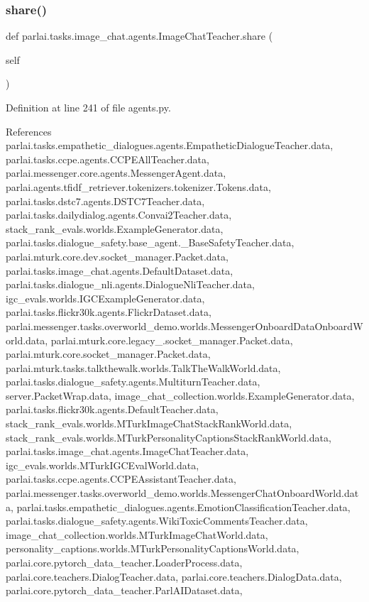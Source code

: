 \subsubsection{\texorpdfstring{share()}{share()}}
{\footnotesize\ttfamily def parlai.\+tasks.\+image\+\_\+chat.\+agents.\+Image\+Chat\+Teacher.\+share (\begin{DoxyParamCaption}\item[{}]{self }\end{DoxyParamCaption})}



Definition at line 241 of file agents.\+py.



References parlai.\+tasks.\+empathetic\+\_\+dialogues.\+agents.\+Empathetic\+Dialogue\+Teacher.\+data, parlai.\+tasks.\+ccpe.\+agents.\+C\+C\+P\+E\+All\+Teacher.\+data, parlai.\+messenger.\+core.\+agents.\+Messenger\+Agent.\+data, parlai.\+agents.\+tfidf\+\_\+retriever.\+tokenizers.\+tokenizer.\+Tokens.\+data, parlai.\+tasks.\+dstc7.\+agents.\+D\+S\+T\+C7\+Teacher.\+data, parlai.\+tasks.\+dailydialog.\+agents.\+Convai2\+Teacher.\+data, stack\+\_\+rank\+\_\+evals.\+worlds.\+Example\+Generator.\+data, parlai.\+tasks.\+dialogue\+\_\+safety.\+base\+\_\+agent.\+\_\+\+Base\+Safety\+Teacher.\+data, parlai.\+mturk.\+core.\+dev.\+socket\+\_\+manager.\+Packet.\+data, parlai.\+tasks.\+image\+\_\+chat.\+agents.\+Default\+Dataset.\+data, parlai.\+tasks.\+dialogue\+\_\+nli.\+agents.\+Dialogue\+Nli\+Teacher.\+data, igc\+\_\+evals.\+worlds.\+I\+G\+C\+Example\+Generator.\+data, parlai.\+tasks.\+flickr30k.\+agents.\+Flickr\+Dataset.\+data, parlai.\+messenger.\+tasks.\+overworld\+\_\+demo.\+worlds.\+Messenger\+Onboard\+Data\+Onboard\+World.\+data, parlai.\+mturk.\+core.\+legacy\+\_.\+socket\+\_\+manager.\+Packet.\+data, parlai.\+mturk.\+core.\+socket\+\_\+manager.\+Packet.\+data, parlai.\+mturk.\+tasks.\+talkthewalk.\+worlds.\+Talk\+The\+Walk\+World.\+data, parlai.\+tasks.\+dialogue\+\_\+safety.\+agents.\+Multiturn\+Teacher.\+data, server.\+Packet\+Wrap.\+data, image\+\_\+chat\+\_\+collection.\+worlds.\+Example\+Generator.\+data, parlai.\+tasks.\+flickr30k.\+agents.\+Default\+Teacher.\+data, stack\+\_\+rank\+\_\+evals.\+worlds.\+M\+Turk\+Image\+Chat\+Stack\+Rank\+World.\+data, stack\+\_\+rank\+\_\+evals.\+worlds.\+M\+Turk\+Personality\+Captions\+Stack\+Rank\+World.\+data, parlai.\+tasks.\+image\+\_\+chat.\+agents.\+Image\+Chat\+Teacher.\+data, igc\+\_\+evals.\+worlds.\+M\+Turk\+I\+G\+C\+Eval\+World.\+data, parlai.\+tasks.\+ccpe.\+agents.\+C\+C\+P\+E\+Assistant\+Teacher.\+data, parlai.\+messenger.\+tasks.\+overworld\+\_\+demo.\+worlds.\+Messenger\+Chat\+Onboard\+World.\+data, parlai.\+tasks.\+empathetic\+\_\+dialogues.\+agents.\+Emotion\+Classification\+Teacher.\+data, parlai.\+tasks.\+dialogue\+\_\+safety.\+agents.\+Wiki\+Toxic\+Comments\+Teacher.\+data, image\+\_\+chat\+\_\+collection.\+worlds.\+M\+Turk\+Image\+Chat\+World.\+data, personality\+\_\+captions.\+worlds.\+M\+Turk\+Personality\+Captions\+World.\+data, parlai.\+core.\+pytorch\+\_\+data\+\_\+teacher.\+Loader\+Process.\+data, parlai.\+core.\+teachers.\+Dialog\+Teacher.\+data, parlai.\+core.\+teachers.\+Dialog\+Data.\+data, parlai.\+core.\+pytorch\+\_\+data\+\_\+teacher.\+Parl\+A\+I\+Dataset.\+data, 